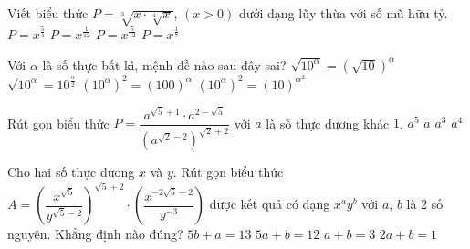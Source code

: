 \begin{ex}%
	Viết biểu thức $P=\sqrt[3]{x\cdot\sqrt[4]{x}}$, $(x>0)$ dưới dạng  lũy thừa với số mũ hữu tỷ.
	\choice 
		{$P=x^{\tfrac{5}{4}}$} 
		{$P=x^{\tfrac{1}{12}}$} 
		 {\True $P=x^{\tfrac{5}{12}}$}
		{$P=x^{\tfrac{1}{7}}$} 
\end{ex}

\begin{ex}%
	Với $\alpha$ là số thực bất kì, mệnh đề nào sau đây sai? 
	 \choice
		 {$\sqrt{10^\alpha}=(\sqrt{10})^\alpha$}
		 {$\sqrt{10^\alpha}=10^{\tfrac{\alpha}{2}}$}
		 {$\left(10^\alpha\right)^2=(100)^\alpha$}
		{\True $\left(10^\alpha\right)^2=(10)^{\alpha^2}$} 
\end{ex}

\begin{ex}%
	 Rút gọn biểu thức
	$P=\dfrac{a^{\sqrt 5 + 1} \cdot a^{2 - \sqrt 5}}{\left(a^{\sqrt 2 - 2}\right)^{\sqrt 2 + 2}}$ với $ a$ là số thực  dương khác $1$.
	 \choice
		{\True $a^5$} 
		{$ a$} 
		{$a^3$} 
		{$a^4$} 
\end{ex}

\begin{ex}%
	Cho hai số thực dương $ x$ và $ y$. Rút gọn  biểu thức
	$A=\left(\dfrac{x^{\sqrt 5}}{y^{\sqrt 5 - 2}}\right)^{\sqrt 5 + 2}\cdot \left(\dfrac{x^{- 2\sqrt 5 - 2}}{y^{- 3}}\right)$ được kết quả có  dạng ${x^a}{y^b}$ với $ a$, $ b$ là 2 số nguyên. Khẳng định nào đúng?
	\choice 
		 {\True $5b+a=13$}
		{$5a+b=12$} 
		 {$ a+b=3$}
		{$2a+b=1$} 
\end{ex}

